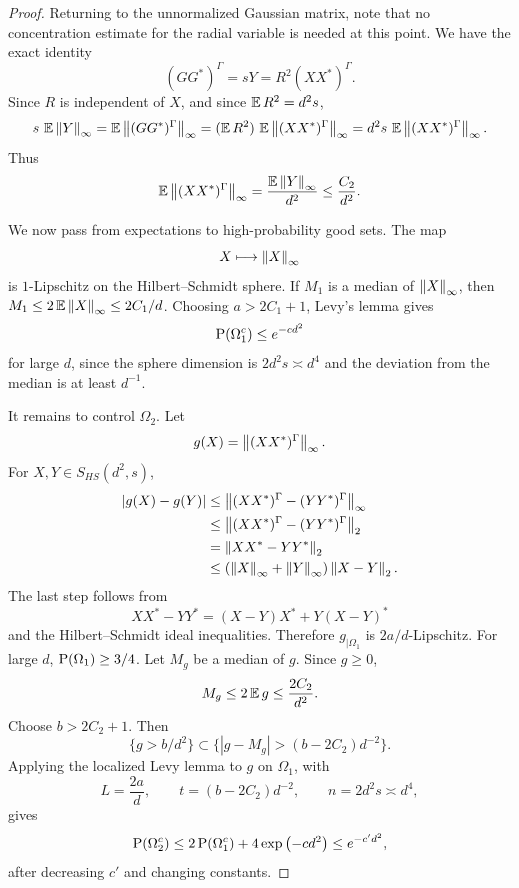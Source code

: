 \begin{proof}
Returning to the unnormalized Gaussian matrix, note that no concentration
estimate for the radial variable is needed at this point.  We have the exact
identity
\[
    (GG^*)^\Gamma=sY=R^2(XX^*)^\Gamma.
\]
Since \(R\) is independent of \(X\), and since \(\operatorname{\mathbb{E}} R^2=d^2s\),
\[
    s\,\operatorname{\mathbb{E}}\left\lVert Y\right\rVert_\infty
    =
    \operatorname{\mathbb{E}}\left\lVert(GG^*)^\Gamma\right\rVert_\infty
    =
    (\operatorname{\mathbb{E}} R^2)\,\operatorname{\mathbb{E}}\left\lVert(XX^*)^\Gamma\right\rVert_\infty
    =
    d^2s\,\operatorname{\mathbb{E}}\left\lVert(XX^*)^\Gamma\right\rVert_\infty.
\]
Thus
\[
    \operatorname{\mathbb{E}}\left\lVert(XX^*)^\Gamma\right\rVert_\infty
    =
    \frac{\operatorname{\mathbb{E}}\left\lVert Y\right\rVert_\infty}{d^2}
    \le \frac{C_2}{d^2}.
\]

We now pass from expectations to high-probability good sets.  The map
\[
    X\longmapsto \left\lVert X\right\rVert_\infty
\]
is \(1\)-Lipschitz on the Hilbert--Schmidt sphere.  If \(M_1\) is a median of
\(\left\lVert X\right\rVert_\infty\), then \(M_1\le 2\operatorname{\mathbb{E}}\left\lVert X\right\rVert_\infty\le 2C_1/d\).
Choosing \(a>2C_1+1\), Levy's lemma gives
\[
    \operatorname{P}(\Omega_1^c)\le e^{-cd^2}
\]
for large \(d\), since the sphere dimension is \(2d^2s\asymp d^4\) and the
deviation from the median is at least \(d^{-1}\).

It remains to control \(\Omega_2\).  Let
\[
    g(X)=\left\lVert(XX^*)^\Gamma\right\rVert_\infty.
\]
For \(X,Y\in S_{HS}(d^2,s)\),
\[
\begin{aligned}
    |g(X)-g(Y)|
    &\le
    \left\lVert(XX^*)^\Gamma-(YY^*)^\Gamma\right\rVert_\infty  \\
    &\le
    \left\lVert(XX^*)^\Gamma-(YY^*)^\Gamma\right\rVert_2       \\
    &=
    \left\lVert XX^*-YY^*\right\rVert_2                         \\
    &\le
    (\left\lVert X\right\rVert_\infty+\left\lVert Y\right\rVert_\infty)\left\lVert X-Y\right\rVert_2.
\end{aligned}
\]
The last step follows from
\[
    XX^*-YY^*=(X-Y)X^*+Y(X-Y)^*
\]
and the Hilbert--Schmidt ideal inequalities.
Therefore \(g_{\mid\Omega_1}\) is \(2a/d\)-Lipschitz.  For large \(d\),
\(\operatorname{P}(\Omega_1)\ge3/4\).  Let \(M_g\) be a median of \(g\).  Since \(g\ge0\),
\[
    M_g\le 2\operatorname{\mathbb{E}} g\le \frac{2C_2}{d^2}.
\]
Choose \(b>2C_2+1\).  Then
\[
    \{g>b/d^2\}
    \subset
    \{|g-M_g|>(b-2C_2)d^{-2}\}.
\]
Applying the localized Levy lemma to \(g\) on \(\Omega_1\), with
\[
    L=\frac{2a}{d},
    \qquad
    t=(b-2C_2)d^{-2},
    \qquad
    n=2d^2s\asymp d^4,
\]
gives
\[
    \operatorname{P}(\Omega_2^c)
    \le
    2\operatorname{P}(\Omega_1^c)
    +4\exp\left(-c d^2\right)
    \le e^{-c'd^2},
\]
after decreasing \(c'\) and changing constants.
\end{proof}

